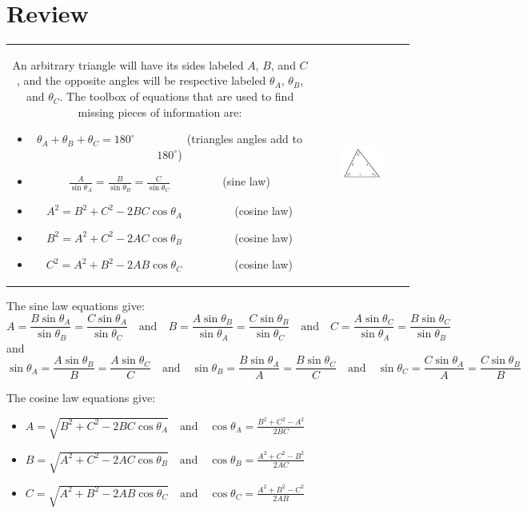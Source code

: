 \documentclass{article}
\begin{document}
\section*{Review}

\begin{tabular}{cc}
\parbox{0.5\textwidth}{
An arbitrary triangle will have its sides labeled \(A\), \(B\), and \(C\), and the opposite angles will be respective labeled \(\theta_A\), \(\theta_B\), and \(\theta_C\). The toolbox of equations that are used to find missing pieces of information are:
\begin{itemize}
\item \(\theta_A + \theta_B + \theta_C = 180^\circ\) ~~~~~~~~ (triangles angles add to \(180^\circ\))
\item \(\frac{A}{\sin\theta_A} = \frac{B}{\sin\theta_B} = \frac{C}{\sin\theta_C}\) ~~~~~~~~ (sine law)
\item \(A^2 = B^2 + C^2 - 2BC\cos\theta_A\) ~~~~~~~~ (cosine law)
\item \(B^2 = A^2 + C^2 - 2AC\cos\theta_B\) ~~~~~~~~ (cosine law)
\item \(C^2 = A^2 + B^2 - 2AB\cos\theta_C\) ~~~~~~~~ (cosine law)
\end{itemize}
} & \parbox{0.5\textwidth}{
\includegraphics[width = 0.5\textwidth]{general_triangle}
}
\end{tabular}

The sine law equations give:
\[A = \frac{B\sin\theta_A}{\sin\theta_B} = \frac{C\sin\theta_A}{\sin\theta_C} \quad\text{and}\quad B = \frac{A\sin\theta_B}{\sin\theta_A} = \frac{C\sin\theta_B}{\sin\theta_C} \quad\text{and}\quad C = \frac{A\sin\theta_C}{\sin\theta_A} = \frac{B\sin\theta_C}{\sin\theta_B}\]
and
\[\sin\theta_A = \frac{A\sin\theta_B}{B} = \frac{A\sin\theta_C}{C} \quad\text{and}\quad \sin\theta_B = \frac{B\sin\theta_A}{A} = \frac{B\sin\theta_C}{C} \quad\text{and}\quad \sin\theta_C = \frac{C\sin\theta_A}{A} = \frac{C\sin\theta_B}{B}\]

The cosine law equations give:
\begin{itemize}
\item \(A = \sqrt{B^2 + C^2 - 2BC\cos\theta_A} \quad\text{and}\quad \cos\theta_A = \frac{B^2 + C^2 - A^2}{2BC}\)
\item \(B = \sqrt{A^2 + C^2 - 2AC\cos\theta_B} \quad\text{and}\quad \cos\theta_B = \frac{A^2 + C^2 - B^2}{2AC}\)
\item \(C = \sqrt{A^2 + B^2 - 2AB\cos\theta_C} \quad\text{and}\quad \cos\theta_C = \frac{A^2 + B^2 - C^2}{2AB}\)
\end{itemize}
\end{document}
